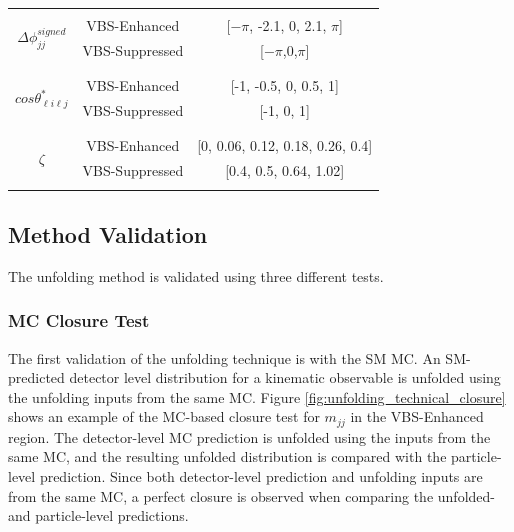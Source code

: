 \begin{table}
\begin{center}
\begin{tabular}{ | c | c | c | }
    & &\\
    \hline
    \multirow{4}{*}{ $\Delta \phi_{jj}^{signed}$ } &  &  \\
    & VBS-Enhanced & [$-\pi$, -2.1, 0, 2.1, $\pi$] \\
    & VBS-Suppressed & [$-\pi$,0,$\pi$] \\
    & & \\
    \hline
    \multirow{4}{*}{ $cos \theta_{\ell i\ell j}^{\ast}$ } &  &  \\
    & VBS-Enhanced & [-1, -0.5, 0, 0.5, 1] \\
    & VBS-Suppressed & [-1, 0, 1]\\
    & & \\
    \hline
    \multirow{4}{*}{ $\zeta$ } &  &  \\
    & VBS-Enhanced &[0, 0.06, 0.12, 0.18, 0.26, 0.4] \\
    & VBS-Suppressed & [0.4, 0.5, 0.64, 1.02]\\
    & &\\
    \hline
    \end{tabular}
    \end{center}
\end{table}

\subsection{Method Validation}
\label{subsec:UnfoldingValidation}
The unfolding method is validated using three different tests.

\subsubsection{MC Closure Test}
\label{subsubsec:MCClosure}

The first validation of the unfolding technique is with the SM MC. An SM-predicted detector level distribution for a kinematic observable is unfolded using the unfolding inputs from the same MC. Figure \ref{fig:unfolding_technical_closure} shows an example of the MC-based closure test for $m_{jj}$ in the VBS-Enhanced region. The detector-level MC prediction is unfolded using the inputs from the same MC, and the resulting unfolded distribution is compared with the particle-level prediction. Since both detector-level prediction and unfolding inputs are from the same MC, a perfect closure is observed when comparing the unfolded- and particle-level predictions.

